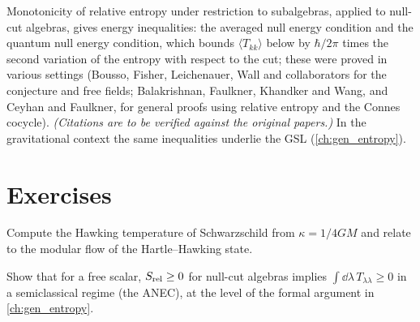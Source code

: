 Monotonicity of relative entropy under restriction to subalgebras, applied to null-cut algebras, gives energy inequalities: the averaged null energy condition and the quantum null energy condition, which bounds $\langle T_{kk}\rangle$ below by $\hbar/2\pi$ times the second variation of the entropy with respect to the cut; these were proved in various settings (Bousso, Fisher, Leichenauer, Wall and collaborators for the conjecture and free fields; Balakrishnan, Faulkner, Khandker and Wang, and Ceyhan and Faulkner, for general proofs using relative entropy and the Connes cocycle). \emph{(Citations are to be verified against the original papers.)} In the gravitational context the same inequalities underlie the GSL (\cref{ch:gen_entropy}).

\section*{Exercises}
\begin{exercise}
Compute the Hawking temperature of Schwarzschild from $\kappa=1/4GM$ and relate to the modular flow of the Hartle--Hawking state.
\end{exercise}
\begin{exercise}
Show that for a free scalar, $S_{\rm rel}\ge0$ for null-cut algebras implies $\int\dd\lambda\,T_{\lambda\lambda}\ge0$ in a semiclassical regime (the ANEC), at the level of the formal argument in \cref{ch:gen_entropy}.
\end{exercise}
